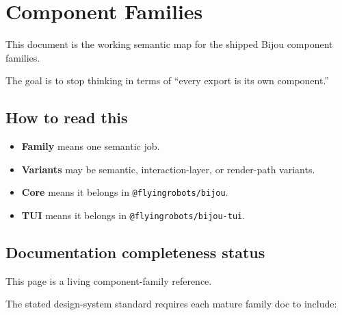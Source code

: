 \chapter{Component Families}\label{record-019}

\smallskip

This document is the working semantic map for the shipped Bijou component families.

The goal is to stop thinking in terms of ``every export is its own component.''

\section{How to read this}\label{record-019-how-to-read-this}

\begin{itemize}
\tightlist
\item
  \textbf{Family} means one semantic job.
\item
  \textbf{Variants} may be semantic, interaction-layer, or render-path variants.
\item
  \textbf{Core} means it belongs in \texttt{@\allowbreak{}f\allowbreak{}l\allowbreak{}y\allowbreak{}i\allowbreak{}n\allowbreak{}g\allowbreak{}r\allowbreak{}o\allowbreak{}b\allowbreak{}o\allowbreak{}t\allowbreak{}s\allowbreak{}/\allowbreak{}b\allowbreak{}i\allowbreak{}j\allowbreak{}o\allowbreak{}u}.
\item
  \textbf{TUI} means it belongs in \texttt{@\allowbreak{}f\allowbreak{}l\allowbreak{}y\allowbreak{}i\allowbreak{}n\allowbreak{}g\allowbreak{}r\allowbreak{}o\allowbreak{}b\allowbreak{}o\allowbreak{}t\allowbreak{}s\allowbreak{}/\allowbreak{}b\allowbreak{}i\allowbreak{}j\allowbreak{}o\allowbreak{}u\allowbreak{}-\allowbreak{}t\allowbreak{}u\allowbreak{}i}.
\end{itemize}

\section{Documentation completeness status}\label{record-019-documentation-completeness-status}

This page is a living component-family reference.

The stated design-system standard requires each mature family doc to include:

